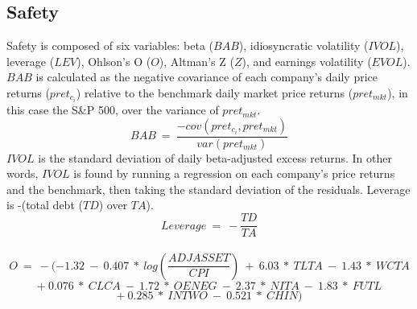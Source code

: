 \documentclass[titlepage]{article}
\begin{document}
\subsection*{Safety}
Safety is composed of six variables: beta ($BAB$), idiosyncratic volatility ($IVOL$), leverage ($LEV$), Ohlson's O ($O$), Altman's Z ($Z$), and earnings volatility ($EVOL$). $BAB$ is calculated as the negative covariance of each company's daily price returns ($pret_{c_i}$) relative to the benchmark daily market price returns ($pret_{mkt}$), in this case the S\&P 500, over the variance of $pret_{mkt}$. $$BAB \ = \ \frac{-cov(pret_{c_i},pret_{mkt})}{var(pret_{mkt})}$$ $IVOL$ is the standard deviation of daily beta-adjusted excess returns. In other words, $IVOL$ is found by running a regression on each company's price returns and the benchmark, then taking the standard deviation of the residuals. Leverage is -(total debt ($TD$) over $TA$). $$Leverage \ = \ -\frac{TD}{TA}$$ 
\\
$$ O \ = \ -(-1.32 \ - \ 0.407 \ * \ log\left(\frac{ADJASSET}{CPI}\right) \ + \ 6.03 \ * \ TLTA \ - \ 1.43 \ * \ WCTA$$
$$ + \ 0.076 \ * \ CLCA \ - \ 1.72 \ * \ OENEG \ - \ 2.37 \ * \ NITA \ - \ 1.83 \ * \ FUTL$$
$$ + \ 0.285 \ * \ INTWO \ - \ 0.521 \ * \ CHIN)$$ 
\end{document}
